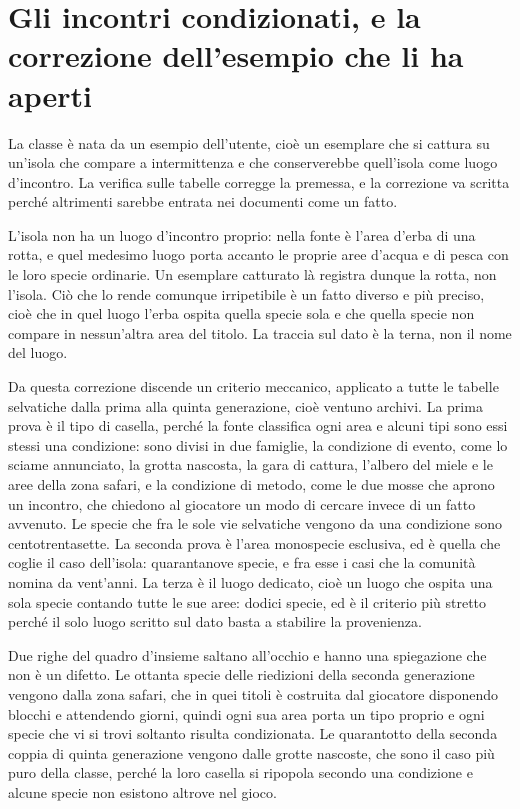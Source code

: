 \section{Gli incontri condizionati, e la correzione dell'esempio che li ha aperti}

La classe è nata da un esempio dell'utente, cioè un esemplare che si cattura su un'isola che compare a intermittenza e che conserverebbe quell'isola come luogo d'incontro. La verifica sulle tabelle corregge la premessa, e la correzione va scritta perché altrimenti sarebbe entrata nei documenti come un fatto.

L'isola non ha un luogo d'incontro proprio: nella fonte è l'area d'erba di una rotta, e quel medesimo luogo porta accanto le proprie aree d'acqua e di pesca con le loro specie ordinarie. Un esemplare catturato là registra dunque la rotta, non l'isola. Ciò che lo rende comunque irripetibile è un fatto diverso e più preciso, cioè che in quel luogo l'erba ospita quella specie sola e che quella specie non compare in nessun'altra area del titolo. La traccia sul dato è la terna, non il nome del luogo.

Da questa correzione discende un criterio meccanico, applicato a tutte le tabelle selvatiche dalla prima alla quinta generazione, cioè ventuno archivi. La prima prova è il tipo di casella, perché la fonte classifica ogni area e alcuni tipi sono essi stessi una condizione: sono divisi in due famiglie, la condizione di evento, come lo sciame annunciato, la grotta nascosta, la gara di cattura, l'albero del miele e le aree della zona safari, e la condizione di metodo, come le due mosse che aprono un incontro, che chiedono al giocatore un modo di cercare invece di un fatto avvenuto. Le specie che fra le sole vie selvatiche vengono da una condizione sono centotrentasette. La seconda prova è l'area monospecie esclusiva, ed è quella che coglie il caso dell'isola: quarantanove specie, e fra esse i casi che la comunità nomina da vent'anni. La terza è il luogo dedicato, cioè un luogo che ospita una sola specie contando tutte le sue aree: dodici specie, ed è il criterio più stretto perché il solo luogo scritto sul dato basta a stabilire la provenienza.

Due righe del quadro d'insieme saltano all'occhio e hanno una spiegazione che non è un difetto. Le ottanta specie delle riedizioni della seconda generazione vengono dalla zona safari, che in quei titoli è costruita dal giocatore disponendo blocchi e attendendo giorni, quindi ogni sua area porta un tipo proprio e ogni specie che vi si trovi soltanto risulta condizionata. Le quarantotto della seconda coppia di quinta generazione vengono dalle grotte nascoste, che sono il caso più puro della classe, perché la loro casella si ripopola secondo una condizione e alcune specie non esistono altrove nel gioco.

